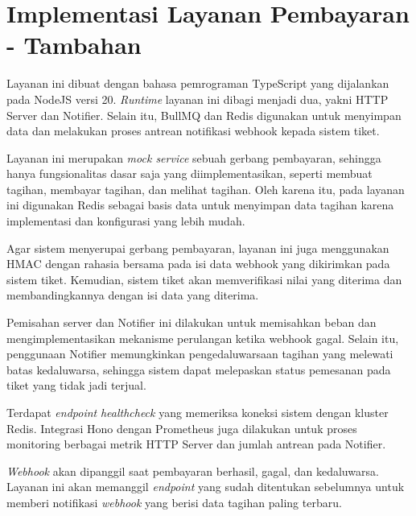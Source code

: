 \chapter{Implementasi Layanan Pembayaran - Tambahan}
\label{apx:payment-implementation}

Layanan ini dibuat dengan bahasa pemrograman TypeScript yang dijalankan pada NodeJS versi 20. \textit{Runtime} layanan ini dibagi menjadi dua, yakni HTTP Server dan Notifier. Selain itu, BullMQ dan Redis digunakan untuk menyimpan data dan melakukan proses antrean notifikasi webhook kepada sistem tiket.

Layanan ini merupakan \textit{mock service} sebuah gerbang pembayaran, sehingga hanya fungsionalitas dasar saja yang diimplementasikan, seperti membuat tagihan, membayar tagihan, dan melihat tagihan. Oleh karena itu, pada layanan ini digunakan Redis sebagai basis data untuk menyimpan data tagihan karena implementasi dan konfigurasi yang lebih mudah.

Agar sistem menyerupai gerbang pembayaran, layanan ini juga menggunakan HMAC dengan rahasia bersama pada isi data webhook yang dikirimkan pada sistem tiket. Kemudian, sistem tiket akan memverifikasi nilai yang diterima dan membandingkannya dengan isi data yang diterima.

Pemisahan server dan Notifier ini dilakukan untuk memisahkan beban dan mengimplementasikan mekanisme perulangan ketika webhook gagal. Selain itu, penggunaan Notifier memungkinkan pengedaluwarsaan tagihan yang melewati batas kedaluwarsa, sehingga sistem dapat melepaskan status pemesanan pada tiket yang tidak jadi terjual.

Terdapat \textit{endpoint} \textit{healthcheck} yang memeriksa koneksi sistem dengan kluster Redis. Integrasi Hono dengan Prometheus juga dilakukan untuk proses monitoring berbagai metrik HTTP Server dan jumlah antrean pada Notifier.

\textit{Webhook} akan dipanggil saat pembayaran berhasil, gagal, dan kedaluwarsa. Layanan ini akan memanggil \textit{endpoint} yang sudah ditentukan sebelumnya untuk memberi notifikasi \textit{webhook} yang berisi data tagihan paling terbaru.